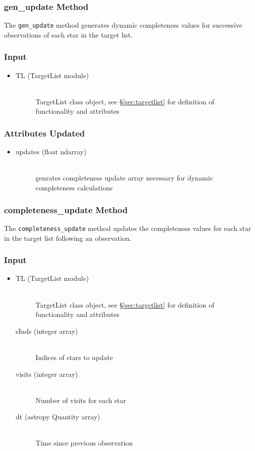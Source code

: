 \documentclass[cleanfoot]{asme2ej}
\begin{document}
\subsubsection{gen\_update Method} \label{sec:genupdatetask}
The \verb+gen_update+ method generates dynamic completeness values for successive observations of each star in the target list.
\subsubsection*{Input}
\begin{itemize}
\item 
\begin{description}
    \item[TL (TargetList module)] \hfill \\ TargetList class object, see \S\ref{sec:targetlist} for definition of functionality and attributes
\end{description}
\end{itemize}
\subsubsection*{Attributes Updated}
\begin{itemize}
\item
\begin{description}
    \item[updates (float ndarray)] \hfill \\ genrates completeness update array necessary for dynamic completeness calculations
\end{description}
\end{itemize}

\subsubsection{completeness\_update Method}\label{sec:completenessupdatetask}
The \verb+completeness_update+ method updates the completeness values for each star in the target list following an observation.
\subsubsection*{Input}
\begin{itemize}
\item 
\begin{description}
    \item[TL (TargetList module)] \hfill \\ TargetList class object, see \S\ref{sec:targetlist} for definition of functionality and attributes
    \item[sInds (integer array)] \hfill \\ Indices of stars to update
    \item[visits (integer array)] \hfill \\ Number of visits for each star
    \item[dt (astropy Quantity array)] \hfill \\ Time since previous observation
\end{description}
\end{itemize}
\end{document}
